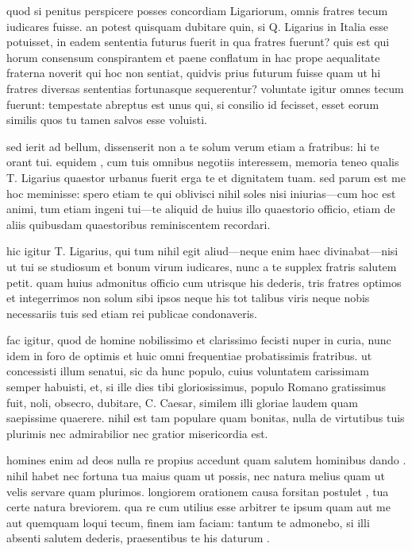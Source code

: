  quod si penitus perspicere posses concordiam Ligariorum, omnis fratres tecum iudicares fuisse. an potest quisquam dubitare quin, si Q. Ligarius in Italia esse potuisset, in eadem sententia futurus fuerit in qua fratres fuerunt? quis est qui horum consensum conspirantem et paene conflatum in hac prope aequalitate fraterna noverit qui hoc non sentiat, quidvis prius futurum fuisse quam ut hi fratres diversas sententias fortunasque sequerentur? voluntate igitur omnes tecum fuerunt: tempestate abreptus est unus qui, si consilio id fecisset, esset eorum similis quos tu tamen salvos esse voluisti.

 sed ierit ad bellum, dissenserit non a te solum verum etiam a fratribus: hi te orant tui. equidem , cum tuis omnibus negotiis interessem, memoria teneo qualis T. Ligarius quaestor urbanus fuerit erga te et dignitatem tuam. sed parum est me hoc meminisse: spero etiam te qui oblivisci nihil soles nisi iniurias—cum hoc est animi, tum etiam ingeni tui—te aliquid de huius illo quaestorio officio, etiam de aliis quibusdam quaestoribus reminiscentem recordari.

 hic igitur T. Ligarius, qui tum nihil egit aliud—neque enim haec divinabat—nisi ut tui se studiosum et bonum virum iudicares, nunc a te supplex fratris salutem petit. quam huius admonitus officio cum utrisque his dederis, tris fratres optimos et integerrimos non solum sibi ipsos neque his tot talibus viris neque nobis necessariis tuis sed etiam rei publicae condonaveris.

 fac igitur, quod de homine nobilissimo et clarissimo fecisti nuper in curia, nunc idem in foro de optimis et huic omni frequentiae probatissimis fratribus. ut concessisti illum senatui, sic da hunc populo, cuius voluntatem carissimam semper habuisti, et, si ille dies tibi gloriosissimus, populo Romano gratissimus fuit, noli, obsecro, dubitare, C. Caesar, similem illi gloriae laudem quam saepissime quaerere. nihil est tam populare quam bonitas, nulla de virtutibus tuis plurimis nec admirabilior nec gratior misericordia est.

 homines enim ad deos nulla re propius accedunt quam salutem hominibus dando . nihil habet nec fortuna tua maius quam ut possis, nec natura melius quam ut velis servare quam plurimos. longiorem orationem causa forsitan postulet , tua certe natura breviorem. qua re cum utilius esse arbitrer te ipsum quam aut me aut quemquam loqui tecum, finem iam faciam: tantum te admonebo, si illi absenti salutem dederis, praesentibus te his daturum .
